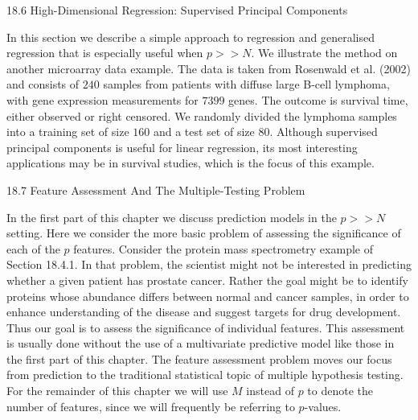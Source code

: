 18.6 High-Dimensional Regression: Supervised Principal Components

In this section we describe a simple approach to regression and generalised regression that is especially useful when $p >> N$. We illustrate the method on another microarray data example. The data is taken from Rosenwald et al. (2002) and consists of $240$ samples from patients with diffuse large B-cell lymphoma, with gene expression measurements for $7399$ genes. The outcome is survival time, either observed or right censored. We randomly divided the lymphoma samples into a training set of size $160$ and a test set of size $80$. Although supervised principal components is useful for linear regression, its most interesting applications may be in survival studies, which is the focus of this example.

18.7 Feature Assessment And The Multiple-Testing Problem

In the first part of this chapter we discuss prediction models in the $p >> N$ setting. Here we consider the more basic problem of assessing the significance of each of the $p$ features. Consider the protein mass spectrometry example of Section 18.4.1. In that problem, the scientist might not be interested in predicting whether a given patient has prostate cancer. Rather the goal might be to identify proteins whose abundance differs between normal and cancer samples, in order to enhance understanding of the disease and suggest targets for drug development. Thus our goal is to assess the significance of individual features. This assessment is usually done without the use of a multivariate predictive model like those in the first part of this chapter. The feature assessment problem moves our focus from prediction to the traditional statistical topic of multiple hypothesis testing. For the remainder of this chapter we will use $M$ instead of $p$ to denote the number of features, since we will frequently be referring to $p$-values.